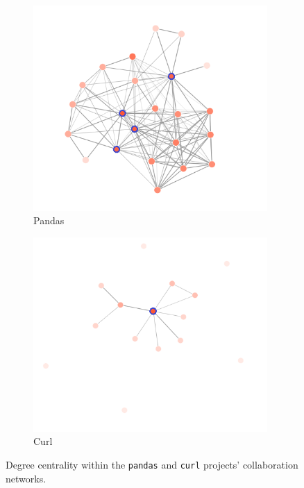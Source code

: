 \begin{figure}
    \centering
    \begin{subfigure}{0.49\textwidth}
        \centering
        \includegraphics[width=0.98\textwidth]{figures/degree_centrality.png}
        \caption{Pandas}
        \label{fig:centrality a}
    \end{subfigure}
    \hfill
    \begin{subfigure}{0.49\textwidth}
        \centering
        \includegraphics[width=0.98\textwidth]{figures/degree_centrality_curl.png}
        \caption{Curl}
        \label{fig:centrality b}
    \end{subfigure}
    \caption{Degree centrality within the \texttt{pandas} and \texttt{curl} projects' collaboration networks. }
    \label{fig:degree centrality}
\end{figure}

